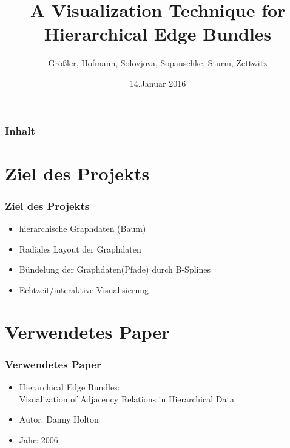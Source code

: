\documentclass[11pt]{beamer}
\author{Größler, Hofmann, Solovjova, Sopauschke, Sturm, Zettwitz}
\title{A Visualization Technique for \\  Hierarchical Edge Bundles}
\date{14.Januar 2016}
\begin{document}
\begin{frame}
\titlepage
\end{frame}

\begin{frame}
\frametitle{Inhalt} 
\tableofcontents
\end{frame}


\section{Ziel des Projekts}
\begin{frame}
\frametitle{Ziel des Projekts}
\begin{itemize} 
\item hierarchische Graphdaten (Baum)
\item Radiales Layout der Graphdaten
\item Bündelung der Graphdaten(Pfade) durch B-Splines
\item Echtzeit/interaktive Visualisierung
\end{itemize}
\end{frame}

\section{Verwendetes Paper}
\begin{frame}
\frametitle{Verwendetes Paper}
\begin{itemize} 
\item Hierarchical Edge Bundles: \\
Visualization of Adjacency Relations in Hierarchical Data
\item Autor: Danny Holton
\item Jahr: 2006
\end{itemize}
\end{frame}
\end{document}
